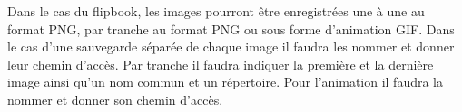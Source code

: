 \begin{description}[style=nextline]
	\item[Enregistrement du flipbook]
	\mbox{\hspace{1cm}}Dans le cas du flipbook, les images pourront être enregistrées une à une au format PNG, par tranche au format PNG ou sous forme d’animation GIF. Dans le cas d’une sauvegarde séparée de chaque image il faudra les nommer et donner leur chemin d’accès. Par tranche il faudra indiquer la première et la dernière image ainsi qu’un nom commun et un répertoire. Pour l’animation il faudra la nommer et donner son chemin d’accès. 
\end{description}
